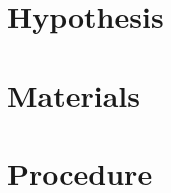 \documentclass[a4paper]{article} %
\newcounter{source}
\begin{document}
\section{Hypothesis}






\section {Materials}











\section {Procedure}
\end{document}
